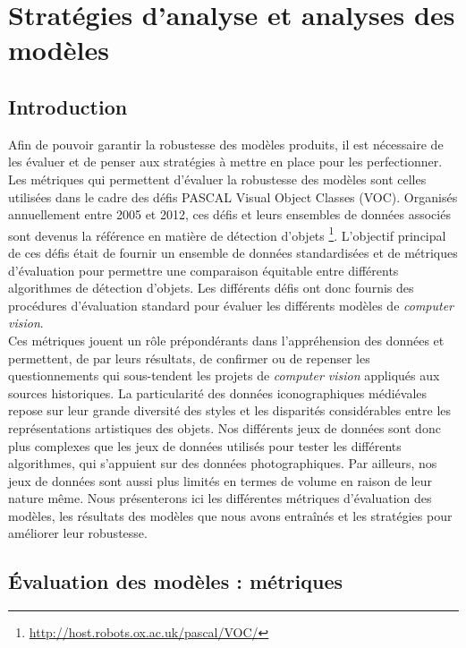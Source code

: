 \documentclass[12pt,twoside]{book}
\begin{document}
\part{Stratégies d'analyse et analyses des modèles}

\chapter{Introduction}

Afin de pouvoir garantir la robustesse des modèles produits, il est nécessaire de les évaluer et de penser aux stratégies à mettre en place pour les perfectionner. Les métriques qui permettent d’évaluer la robustesse des modèles sont celles utilisées dans le cadre des défis PASCAL Visual Object Classes (VOC). Organisés annuellement entre 2005 et 2012, ces défis et leurs ensembles de données associés sont devenus la référence en matière de détection d'objets \footnote{\url{http://host.robots.ox.ac.uk/pascal/VOC/}}. L'objectif principal de ces défis était de fournir un ensemble de données standardisées et de métriques d'évaluation pour permettre une comparaison équitable entre différents algorithmes de détection d'objets. Les différents défis ont donc fournis des procédures d'évaluation standard pour évaluer les différents modèles de \textit{computer vision}. \\

Ces métriques jouent un rôle prépondérants dans l’appréhension des données et permettent, de par leurs résultats, de confirmer ou de repenser les questionnements qui sous-tendent les projets de \textit{computer vision} appliqués aux sources historiques. La particularité des données iconographiques médiévales repose sur leur grande diversité des styles et les disparités considérables entre les représentations artistiques des objets. Nos différents jeux de données sont donc plus complexes que les jeux de données utilisés pour tester les différents algorithmes, qui s'appuient sur des données photographiques. Par ailleurs, nos jeux de données sont aussi plus limités en termes de volume en raison de leur nature même. Nous présenterons ici les différentes métriques d’évaluation des modèles, les résultats des modèles que nous avons entraînés et les stratégies pour améliorer leur robustesse. 

\chapter{Évaluation des modèles : métriques}
\end{document}
